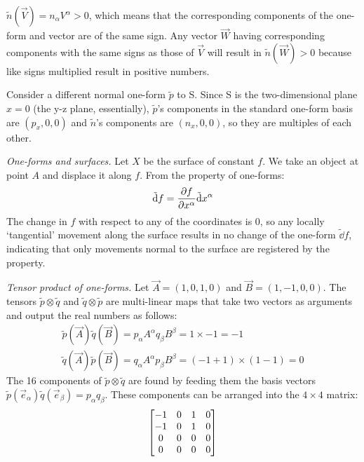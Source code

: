\documentclass{report}
\begin{document}
\begin{subquests}
\begin{subquests}
		\item		
		$\tilde n(\vec V) = n_{\alpha}V^{\alpha} > 0$, which means that the corresponding components of the one-form and vector are of the same sign. Any vector $\vec W$ having corresponding components with the same signs as those of $\vec V$ will result in $\tilde n(\vec W) > 0 $ because like signs multiplied result in positive numbers.

		\item		
		Consider a different normal one-form $\tilde p$ to S. Since S is the two-dimensional plane $x = 0$ (the y-z plane, essentially), $\tilde p$'s components in the standard one-form basis are $(p_x, 0, 0)$ and $\tilde n$'s components are $(n_x, 0, 0)$, so they are multiples of each other.

		\item
	\end{subquests}

	\item \emph{One-forms and surfaces.}
	Let $X$ be the surface of constant $f$. We take an object at point $A$ and displace it along $f$. From the property of one-forms:
	\begin{gather*}
		\tilde{\dd}f = \pdv{f}{x^{\alpha}} \tilde{\dd}x^{\alpha}
	\end{gather*}
	The change in $f$ with respect to any of the coordinates is 0, so any locally `tangential' movement along the surface results in no change of the one-form $\tilde{\dd}f$, indicating that only movements normal to the surface are registered by the property.

	\item \emph{Tensor product of one-forms.}
	Let $\vec A = (1, 0, 1, 0)$ and $\vec B = (1, -1, 0, 0)$. The tensors $\tilde p \otimes \tilde q$ and $\tilde q \otimes \tilde p$ are multi-linear maps that take two vectors as arguments and output the real numbers as follows:
	\begin{gather*}
		\tilde p (\vec A) \tilde q (\vec B) = p_{\alpha} A^{\alpha} q_{\beta} B^{\beta} = 1 \times -1 = -1 \\
		\tilde q (\vec A) \tilde p (\vec B) = q_{\alpha} A^{\alpha} p_{\beta} B^{\beta} = (-1 + 1) \times (1 - 1) = 0
	\end{gather*}
	The 16 components of $\tilde p \otimes \tilde q$ are found by feeding them the basis vectors $\tilde p(\vec e_{\alpha}) \tilde q (\vec e_{\beta})= p_{\alpha} q_{\beta}$. These components can be arranged into the $4\times 4$ matrix:
	\begin{gather*}
		\mqty[
			-1 & 0 & 1 & 0 \\
			-1 & 0 & 1 & 0 \\
			0 & 0 & 0 & 0 \\
			0 & 0 & 0 & 0
		]
	\end{gather*}


\end{subquests}
\end{document}
